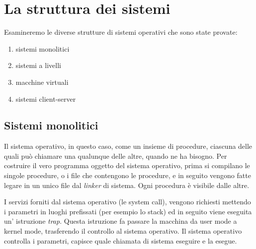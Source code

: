 \section{La struttura dei sistemi}

Esamineremo le diverse strutture di sistemi operativi che sono state provate:
\begin{enumerate}
  \item sistemi monolitici
  \item sistemi a livelli
  \item macchine virtuali
  \item sistemi client-server
\end{enumerate}

\subsection{Sistemi monolitici}

Il sistema operativo, in questo caso, come un insieme di procedure, ciascuna delle quali può chiamare una qualunque delle altre, quando ne ha bisogno.
Per costruire il vero programma oggetto del sistema operativo, prima si compilano le singole procedure, o i file che contengono le procedure, e in seguito vengono fatte legare in un unico file dal \textit{linker} di sistema. Ogni procedura è visibile dalle altre.

I servizi forniti dal sistema operativo (le system call), vengono richiesti mettendo i parametri in luoghi prefissati (per esempio lo stack) ed in seguito viene eseguita un' istruzione \textit{trap}. Questa istruzione fa passare la macchina da user mode a kernel mode, trasferendo il controllo al sistema operativo. Il sistema operativo controlla i parametri, capisce quale chiamata di sistema eseguire e la esegue.

